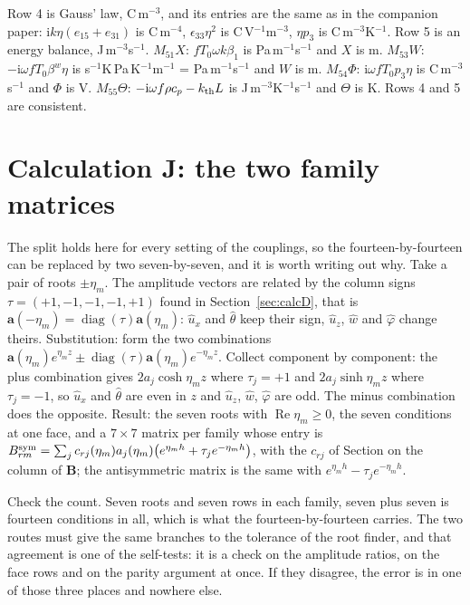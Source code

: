 \documentclass[11pt]{article}
\makeatletter
\newif\ifshowworked
\newenvironment{worked}{%
  \ifshowworked\par\smallskip\noindent\textit{Working.}\par\smallskip\else
  \setbox\z@\vbox\bgroup\fi}{\ifshowworked\par\smallskip\else\egroup\fi}
\newcommand{\ii}{\mathrm{i}}
\makeatother
\begin{document}
\begin{worked}
Row 4 is Gauss' law, C\,m$^{-3}$, and its entries are the same as in the companion paper:
$\ii k\eta(e_{15}+e_{31})$ is C\,m$^{-4}$, $\epsilon_{33}\eta^2$ is C\,V$^{-1}$m$^{-3}$, $\eta p_3$ is
C\,m$^{-3}$K$^{-1}$. Row 5 is an energy balance, J\,m$^{-3}$s$^{-1}$. $M_{51}X$: $fT_0\omega k\beta_1$ is
Pa\,m$^{-1}$s$^{-1}$ and $X$ is m. $M_{53}W$: $-\ii\omega fT_0\beta^{w}\eta$ is
s$^{-1}$K$\,$Pa\,K$^{-1}$m$^{-1}$ = Pa\,m$^{-1}$s$^{-1}$ and $W$ is m. $M_{54}\Phi$:
$\ii\omega fT_0p_3\eta$ is C\,m$^{-3}$s$^{-1}$ and $\Phi$ is V. $M_{55}\Theta$:
$-\ii\omega f\rho c_p-k_{\rm th}L$ is J\,m$^{-3}$K$^{-1}$s$^{-1}$ and $\Theta$ is K. Rows 4 and 5 are
consistent.
\end{worked}

\section{Calculation J: the two family matrices}

\begin{worked}
The split holds here for every setting of the couplings, so the fourteen-by-fourteen can be replaced by two
seven-by-seven, and it is worth writing out why. Take a pair of roots $\pm\eta_m$. The amplitude vectors
are related by the column signs $\tau=(+1,-1,-1,-1,+1)$ found in Section~\ref{sec:calcD}, that is
$\mathbf a(-\eta_m)=\operatorname{diag}(\tau)\mathbf a(\eta_m)$: $\hat u_x$ and $\hat\theta$ keep their
sign, $\hat u_z$, $\hat w$ and $\hat\varphi$ change theirs.
Substitution: form the two combinations
$\mathbf a(\eta_m)e^{\eta_mz}\pm\operatorname{diag}(\tau)\mathbf a(\eta_m)e^{-\eta_mz}$.
Collect component by component: the plus combination gives $2a_j\cosh\eta_mz$ where $\tau_j=+1$ and
$2a_j\sinh\eta_mz$ where $\tau_j=-1$, so $\hat u_x$ and $\hat\theta$ are even in $z$ and $\hat u_z$,
$\hat w$, $\hat\varphi$ are odd. The minus combination does the opposite.
Result: the seven roots with $\operatorname{Re}\eta_m\ge0$, the seven conditions at one face, and a
$7\times7$ matrix per family whose entry is
$B^{\rm sym}_{rm}=\sum_j c_{rj}(\eta_m)a_j(\eta_m)\bigl(e^{\eta_mh}+\tau_je^{-\eta_mh}\bigr)$,
with the $c_{rj}$ of Section on the column of $\mathbf B$; the antisymmetric matrix is the same with
$e^{\eta_mh}-\tau_je^{-\eta_mh}$.
\end{worked}

\begin{worked}
Check the count. Seven roots and seven rows in each family, seven plus seven is fourteen conditions in
all, which is what the fourteen-by-fourteen carries. The two routes must give the same branches to the
tolerance of the root finder, and that agreement is one of the self-tests: it is a check on the amplitude
ratios, on the face rows and on the parity argument at once. If they disagree, the error is in one of those
three places and nowhere else.
\end{worked}
\end{document}
